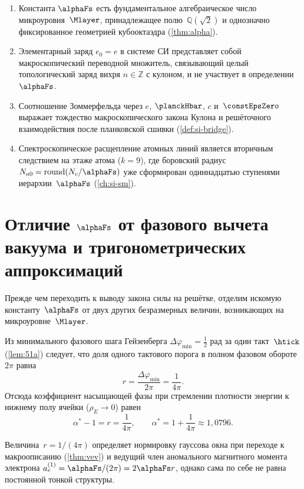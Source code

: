 \begin{remark}
\label{rem:alpha-name-order}
\begin{enumerate}[label=\arabic*.]
\item Константа $\alphaFs$ есть фундаментальное алгебраическое число микроуровня~$\Mlayer$, принадлежащее полю~$\mathbb{Q}(\sqrt{2})$ и однозначно фиксированное геометрией кубооктаэдра (\cref{thm:alpha}).
\item Элементарный заряд $e_0 = e$ в системе СИ представляет собой макроскопический переводной множитель, связывающий целый топологический заряд вихря $n\in\mathbb{Z}$ с кулоном, и не участвует в определении~$\alphaFs$.
\item Соотношение Зоммерфельда через $e$, $\planckHbar$, $c$ и~$\constEpsZero$ выражает тождество макроскопического закона Кулона и решёточного взаимодействия после планковской сшивки (\cref{def:si-bridge}).
\item Спектроскопическое расщепление атомных линий является вторичным следствием на этаже атома ($k=9$), где боровский радиус $N_{a0} = \mathrm{round}(N_c/\alphaFs)$ уже сформирован одиннадцатью ступенями иерархии~$\alphaFs$ (\cref{ch:si-sm}).
\end{enumerate}
\end{remark}

\section{Отличие $\alphaFs$ от фазового вычета вакуума и тригонометрических аппроксимаций}

Прежде чем переходить к выводу закона силы на решётке, отделим искомую константу~$\alphaFs$ от двух других безразмерных величин, возникающих на микроуровне~$\Mlayer$.

\begin{lemma}
\label{lem:vacuum-phase-residue}
Из минимального фазового шага Гейзенберга $\Delta\varphi_{\min} = \tfrac{1}{2}$ рад за один такт~$\htick$ (\cref{lem:51a}) следует, что доля одного тактового порога в полном фазовом обороте~$2\pi$ равна
\[
  r = \frac{\Delta\varphi_{\min}}{2\pi} = \frac{1}{4\pi}.
\]
Отсюда коэффициент насыщающей фазы при стремлении плотности энергии к нижнему полу ячейки ($\rho_E\to 0$) равен
\[
  \alpha^* - 1 = r = \frac{1}{4\pi},\qquad
  \alpha^* = 1 + \frac{1}{4\pi} \approx 1{,}0796.
\]
\end{lemma}

Величина~$r = 1/(4\pi)$ определяет нормировку гауссова окна при переходе к макроописанию (\cref{thm:vev}) и ведущий член аномального магнитного момента электрона $a_e^{(1)} = \alphaFs/(2\pi) = 2\alphaFs r$, однако сама по себе не равна постоянной тонкой структуры.


